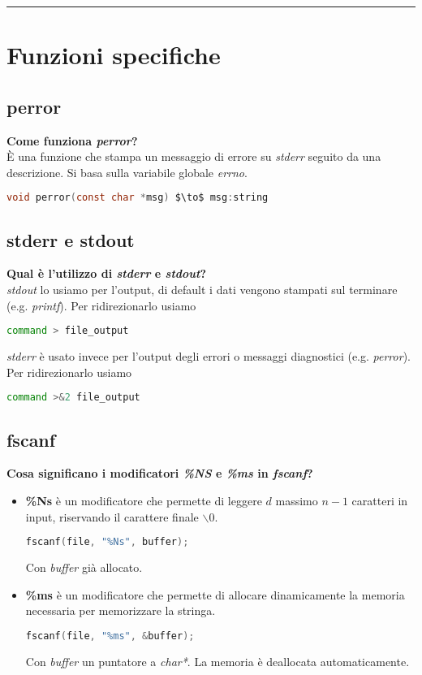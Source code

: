 \documentclass[a4paper,10pt]{article}
\theoremstyle{remark}
\theoremstyle{definition}
\theoremstyle{plain}
\theoremstyle{definition}
\theoremstyle{definition}
\theoremstyle{definition}
\theoremstyle{plain}
\theoremstyle{plain}
\begin{document}


\tableofcontents
\begin{center}
    \vspace{-20pt}
    \rule{11cm}{.1pt} 
\end{center}
\newpage
\section{Funzioni specifiche}
\subsection{perror}
\textbf{Come funziona \textit{perror}?}\\
È una funzione che stampa un messaggio di errore su \textit{stderr} seguito da una descrizione. Si basa sulla variabile globale \textit{errno}.
\begin{lstlisting}[language=C, mathescape]
	void perror(const char *msg) $\to$ msg:string
\end{lstlisting}
\subsection{stderr e stdout}
\textbf{Qual è l'utilizzo di \textit{stderr} e \textit{stdout}?}\\
\textit{stdout} lo usiamo per l'output, di default i dati vengono stampati sul terminare (e.g. \textit{printf}). Per ridirezionarlo usiamo
\begin{lstlisting}[language=BASH]
	command > file_output
\end{lstlisting}
\textit{stderr} è usato invece per l'output degli errori o messaggi diagnostici (e.g. \textit{perror}). Per ridirezionarlo usiamo
\begin{lstlisting}[language=BASH]
	command >&2 file_output
\end{lstlisting}
\subsection{fscanf}
\textbf{Cosa significano i modificatori \textit{\%NS} e \textit{\%ms} in \textit{fscanf}?}\\
\begin{itemize}
	\item \textbf{\%Ns} è un modificatore che permette di leggere $d$ massimo $n-1$ caratteri in input, riservando il carattere finale \textit{$\backslash 0$}.
	\begin{lstlisting}[language=C]
		fscanf(file, "%Ns", buffer);
	\end{lstlisting}
	Con \textit{buffer} già allocato.
	\item \textbf{\%ms} è un modificatore che permette di allocare dinamicamente la memoria necessaria per memorizzare la stringa.
	\begin{lstlisting}[language=C]
		fscanf(file, "%ms", &buffer);
	\end{lstlisting}
	Con \textit{buffer} un puntatore a \textit{char*}. La memoria è deallocata automaticamente.
\end{itemize}
\end{document}
